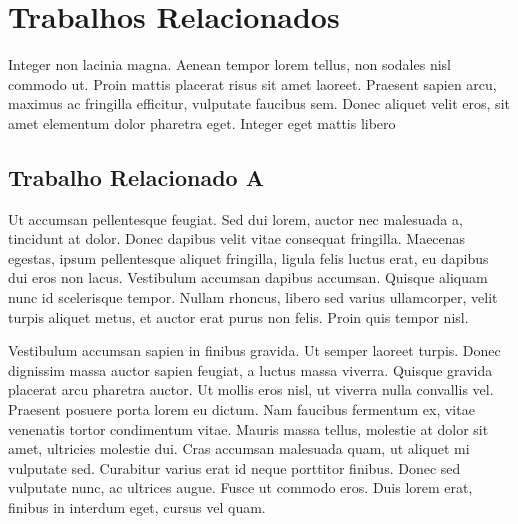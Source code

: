 \chapter{Trabalhos Relacionados}
\label{cap:trabalhos-relacionados}

Integer non lacinia magna. Aenean tempor lorem tellus, non sodales nisl commodo ut. Proin mattis placerat risus sit amet laoreet. Praesent sapien arcu, maximus ac fringilla efficitur, vulputate faucibus sem. Donec aliquet velit eros, sit amet elementum dolor pharetra eget. Integer eget mattis libero

\section{Trabalho Relacionado A}
\label{sec:trabalho-relacionado-a}

Ut accumsan pellentesque feugiat. Sed dui lorem, auctor nec malesuada a, tincidunt at dolor. Donec dapibus velit vitae consequat fringilla. Maecenas egestas, ipsum pellentesque aliquet fringilla, ligula felis luctus erat, eu dapibus dui eros non lacus. Vestibulum accumsan dapibus accumsan. Quisque aliquam nunc id scelerisque tempor. Nullam rhoncus, libero sed varius ullamcorper, velit turpis aliquet metus, et auctor erat purus non felis. Proin quis tempor nisl.

	\begin{figure}[ht!]
		\centering
	\end{figure}

Vestibulum accumsan sapien in finibus gravida. Ut semper laoreet turpis. Donec dignissim massa auctor sapien feugiat, a luctus massa viverra. Quisque gravida placerat arcu pharetra auctor. Ut mollis eros nisl, ut viverra nulla convallis vel. Praesent posuere porta lorem eu dictum. Nam faucibus fermentum ex, vitae venenatis tortor condimentum vitae. Mauris massa tellus, molestie at dolor sit amet, ultricies molestie dui. Cras accumsan malesuada quam, ut aliquet mi vulputate sed. Curabitur varius erat id neque porttitor finibus. Donec sed vulputate nunc, ac ultrices augue. Fusce ut commodo eros. Duis lorem erat, finibus in interdum eget, cursus vel quam.

